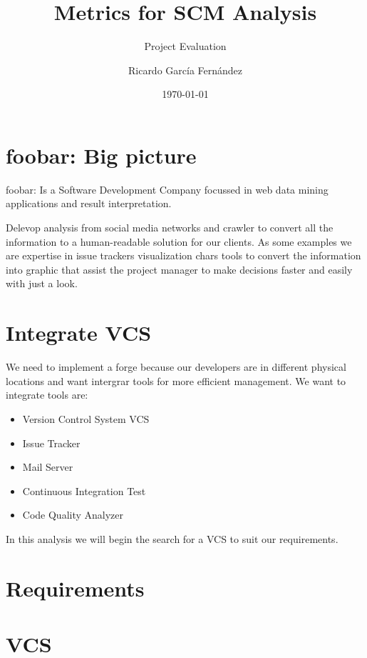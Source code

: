 \documentclass[11pt]{scrartcl}
\title{\textbf{Metrics for SCM Analysis}}
\subtitle{Project Evaluation}
\author{Ricardo Garc\'ia Fern\'andez}
\date{\today}
\begin{document}
\maketitle

\tableofcontents

\newpage

\section{foobar: Big picture}

foobar: Is a Software Development Company focussed in web data mining applications and result interpretation.

\par Delevop analysis from social media networks and crawler to convert all the information to a human-readable solution for our clients. As some examples we are expertise in issue trackers visualization chars tools to convert the information into graphic that assist the project manager to make decisions faster and easily with just a look.

\section{Integrate VCS}

We need to implement a forge because our developers are in different physical locations and want intergrar tools for more efficient management.
We want to integrate tools are:

\begin{itemize}
    \item Version Control System VCS
    \item Issue Tracker
    \item Mail Server
    \item Continuous Integration Test
    \item Code Quality Analyzer
\end{itemize}

In this analysis we will begin the search for a VCS to suit our requirements.

\section{Requirements}



\section{VCS}
\end{document}
